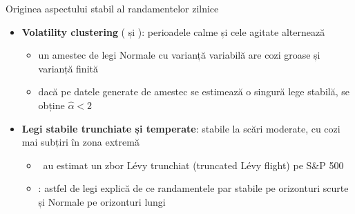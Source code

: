 \begin{frame}{Originea aspectului stabil al randamentelor zilnice}
\itemsize{\small}
\begin{itemize}
    \item \textbf{Volatility clustering} ( și ): perioadele calme și cele agitate alternează
    \begin{itemize}
        \item un amestec de legi Normale cu varianță variabilă are cozi groase și varianță finită 
        \item dacă pe datele generate de amestec se estimează o singură lege stabilă, se obține $\hat\alpha < 2$
    \end{itemize}
    \item \textbf{Legi stabile trunchiate și temperate}: stabile la scări moderate, cu cozi mai subțiri în zona extremă
    \begin{itemize}
        \item {}\ au estimat un zbor Lévy trunchiat (truncated Lévy flight) pe S\&P 500
        \item {}: astfel de legi explică de ce randamentele par stabile pe orizonturi scurte și Normale pe orizonturi lungi
    \end{itemize}
\end{itemize}
\end{frame}


